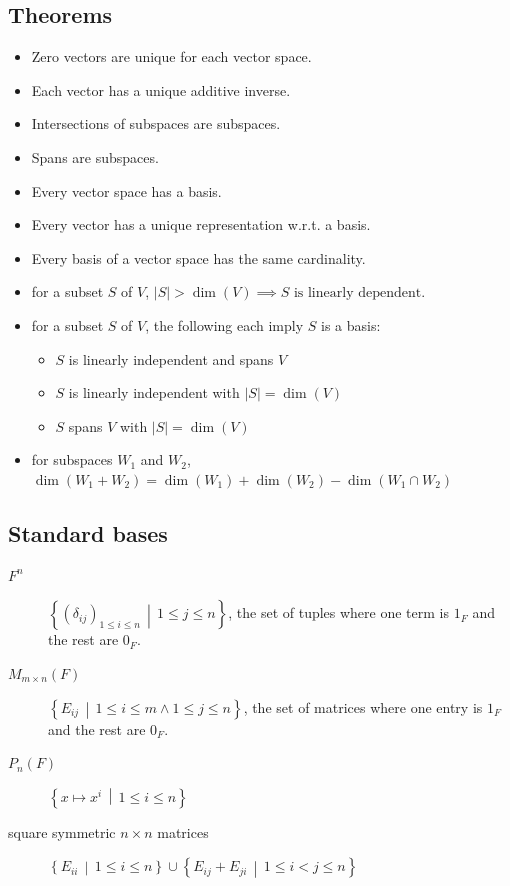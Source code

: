 \documentclass[tbtags,columns=2]{cheatsheet}
\begin{document}
\subsection{Theorems}
\begin{itemize}
    \item Zero vectors are unique for each vector space.
    \item Each vector has a unique additive inverse.
    \item Intersections of subspaces are subspaces.
    \item Spans are subspaces.
    \item Every vector space has a basis.
    \item Every vector has a unique representation w.r.t. a basis.
    \item Every basis of a vector space has the same cardinality.
    \item for a subset $S$ of $V$, $|S| > \dim(V) \implies S \text{ is linearly dependent}$.
    \item for a subset $S$ of $V$, the following each imply $S$ is a basis:\begin{itemize}
        \item $S$ is linearly independent and spans $V$
        \item $S$ is linearly independent with $|S| = \dim(V)$ 
        \item $S$ spans $V$ with $|S| = \dim(V)$
    \end{itemize}
    \item for subspaces $W_1$ and $W_2$, $\dim(W_1 + W_2)=\dim(W_1) + \dim(W_2) - \dim(W_1 \cap W_2)$

\end{itemize}
\subsection{Standard bases}
\begin{description}
    \item[$F^n$] $\left\{ \left( \delta_{ij} \right)_{1\leq i \leq n} \,\middle|\, 1 \leq j \leq n\right\}$, the set of tuples where one term is $1_F$ and the rest are $0_F$.
    \item[$M_{m\times n}(F)$] $\left\{ E_{ij} \,\middle|\, 1\leq i \leq m \land 1 \leq j \leq n \right\}$, the set of matrices where one entry is $1_F$ and the rest are $0_F$.
    \item[$P_n(F)$] $\left\{ x \mapsto x^i \,\middle|\, 1 \leq i \leq n \right\}$
    \item[square symmetric $n\times n$ matrices] $\left\{ E_{ii} \,\middle|\, 1\leq i \leq n \right\} \cup \left\{ E_{ij} + E_{ji} \,\middle|\, 1\leq i < j \leq n \right\}$
\end{description}
\end{document}
